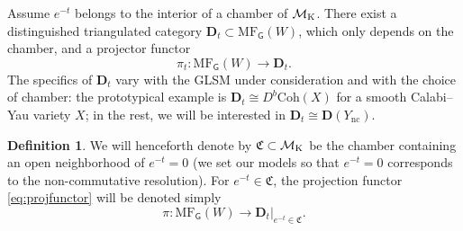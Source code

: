 \documentclass[12pt,a4paper,oneside]{amsart}
\numberwithin{equation}{section}
\theoremstyle{definition}
\newtheorem{defin}[thm]{Definition}
\theoremstyle{remark}
\newcommand{\mM}{\mathcal{M}}
\newcommand{\sG}{\mathsf{G}}
\newcommand{\Ync}{Y_{\mathrm{nc}}}
\newcommand{\MF}{\mathrm{MF}}
\newcommand{\DC}{\mathbf{D}}
\begin{document}
Assume $e^{-t}$ belongs to the interior of a chamber of $\mM_{\text{\rm K}}$. There exist a distinguished triangulated category $\DC_{t} \subset \MF_{\sG} (W)$, which only depends on the chamber, and a projector functor \cite{Herbst:2008jq,Ballard:2016ncw,HalpernLeistner:2014}
\begin{equation}
\label{eq:projfunctor}
	\pi_{t} \colon \MF_{\sG} (W) \longrightarrow \DC_{t} .
\end{equation}
The specifics of $\DC_{t} $ vary with the GLSM under consideration and with the choice of chamber: the prototypical example is $\DC_{t} \cong D^b \mathrm{Coh} (X)$ for a smooth Calabi--Yau variety $X$; in the rest, we will be interested in $\DC_{t}\cong \DC (\Ync)$.
\begin{defin}\label{def:piprojfunct}
We will henceforth denote by $\mathfrak{C} \subset \mM_{\text{\rm K}}$ be the chamber containing an open neighborhood of $e^{-t}=0$ (we set our models so that $e^{-t}=0$ corresponds to the non-commutative resolution). For $e^{-t} \in \mathfrak{C}$, the projection functor \eqref{eq:projfunctor} will be denoted simply 
\begin{equation*}
	\pi \colon \MF_{\sG} (W) \longrightarrow \DC_{t} \vert_{e^{-t} \in \mathfrak{C}} .
\end{equation*}
\end{defin}
\end{document}
